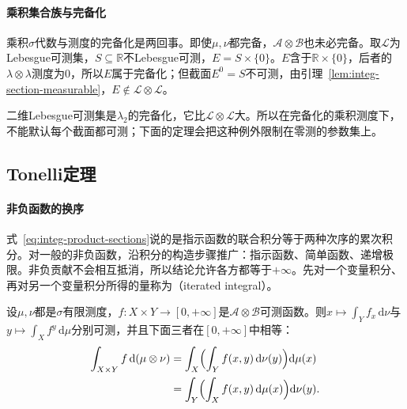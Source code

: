 \paragraph{乘积集合族与完备化}
乘积$\sigma$代数与测度的完备化是两回事。即使$\mu,\nu$都完备，$\mathcal A\otimes\mathcal B$也未必完备。取$\mathcal L$为Lebesgue可测集，$S\subseteq\mathbb R$不Lebesgue可测，$E=S\times\{0\}$。$E$含于$\mathbb R\times\{0\}$，后者的$\lambda\otimes\lambda$测度为$0$，所以$E$属于完备化；但截面$E^0=S$不可测，由引理~\ref{lem:integ-section-measurable}，$E\notin\mathcal L\otimes\mathcal L$。

二维Lebesgue可测集是$\lambda_2$的完备化，它比$\mathcal L\otimes\mathcal L$大。所以在完备化的乘积测度下，不能默认每个截面都可测；下面的定理会把这种例外限制在零测的参数集上。

\subsection{Tonelli定理}
\label{sec:integ-tonelli}

\paragraph{非负函数的换序}
式~\eqref{eq:integ-product-sections}说的是指示函数的联合积分等于两种次序的累次积分。对一般的非负函数，沿积分的构造步骤推广：指示函数、简单函数、递增极限。非负贡献不会相互抵消，所以结论允许各方都等于$+\infty$。先对一个变量积分、再对另一个变量积分所得的量称为（iterated integral）。

\begin{theorem}[Tonelli定理]
\label{thm:integ-tonelli}
设$\mu,\nu$都是$\sigma$有限测度，$f:X\times Y\to[0,+\infty]$是$\mathcal A\otimes\mathcal B$可测函数。则$x\mapsto\int_Yf_x\,\mathrm d\nu$与$y\mapsto\int_Xf^y\,\mathrm d\mu$分别可测，并且下面三者在$[0,+\infty]$中相等：
\begin{equation}
\begin{aligned}
 \int_{X\times Y}f\,\mathrm d(\mu\otimes\nu)&=\int_X\Bigl(\int_Yf(x,y)\,\mathrm d\nu(y)\Bigr)\mathrm d\mu(x)\\
 &=\int_Y\Bigl(\int_Xf(x,y)\,\mathrm d\mu(x)\Bigr)\mathrm d\nu(y).
\end{aligned}
 \label{eq:integ-tonelli}
\end{equation}
\end{theorem}

